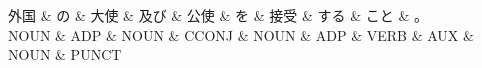 \documentclass[tikz,border=5pt]{standalone}
\begin{document}
\normalsize
\begin{dependency}[edge unit distance=12.0pt]
    \begin{deptext}[column sep=1em]
        外国 \& の \& 大使 \& 及び \& 公使 \& を \& 接受 \& する \& こと \& 。\\
        NOUN \& ADP \& NOUN \& CCONJ \& NOUN \& ADP \& VERB \& AUX \& NOUN \& PUNCT\\
    \end{deptext}
\end{dependency}
\end{document}
